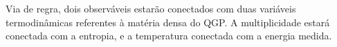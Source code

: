 Via de regra, dois observáveis estarão conectados com duas variáveis termodinâmicas referentes à matéria densa do QGP. A multiplicidade
estará conectada com a entropia, e a temperatura conectada com a energia medida. 